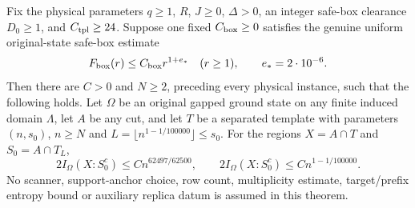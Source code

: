 \begin{theorem}
    \label{thm:template-final-information}
    \leanok
    Fix the physical parameters $q\geq1$, $R$, $J\geq0$, $\Delta>0$,
    an integer safe-box clearance $D_0\geq1$, and $C_{\rm tpl}\geq24$.
    Suppose one fixed $C_{\rm box}\geq0$ satisfies the genuine uniform
    original-state safe-box estimate
    \[
        F_{\rm box}(r)\leq C_{\rm box}r^{1+e_*}
        \quad(r\geq1),\qquad e_*=2\cdot10^{-6}.
    \]
    Then there are $C>0$ and $N\geq2$, preceding every physical instance,
    such that the following holds.  Let $\Omega$ be an original gapped
    ground state on any finite induced domain $\Lambda$, let $A$ be any
    cut, and let $T$ be a separated template with parameters $(n,s_0)$,
    $n\geq N$ and $L=\lfloor n^{1-1/100000}\rfloor\leq s_0$.
    For the regions $X=A\cap T$ and $S_0=A\cap T_L$,
    \[
        2I_\Omega(X:S_0^c)\leq Cn^{62497/62500},\qquad
        2I_\Omega(X:S_0^c)\leq Cn^{1-1/100000}.
    \]
    No scanner, support-anchor choice, row count, multiplicity estimate,
    target/prefix entropy bound or auxiliary replica datum is assumed
    in this theorem.
\end{theorem}

